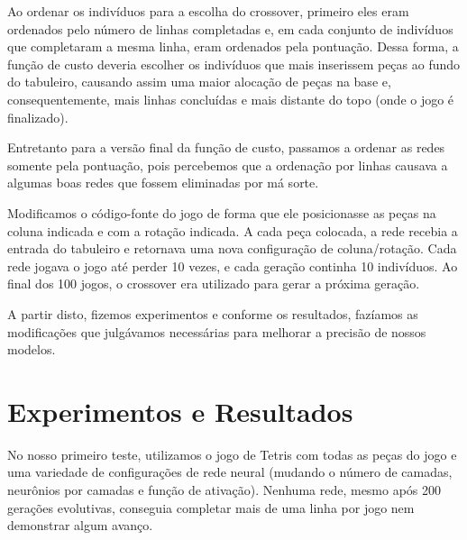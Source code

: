 \documentclass[conference]{IEEEtran}
\begin{document}
Ao ordenar os indivíduos para a escolha do crossover, primeiro eles eram ordenados pelo número de linhas completadas e, em cada conjunto de indivíduos que completaram a mesma linha, eram ordenados pela pontuação. Dessa forma, a função de custo deveria escolher os indivíduos que mais inserissem peças ao fundo do tabuleiro, causando assim uma maior alocação de peças na base e, consequentemente, mais linhas concluídas e mais distante do topo (onde o jogo é finalizado).

Entretanto para a versão final da função de custo, passamos a ordenar as redes somente pela pontuação, pois percebemos que a ordenação por linhas causava a algumas boas redes que fossem eliminadas por má sorte.

Modificamos o código-fonte do jogo de forma que ele posicionasse as peças na coluna indicada e com a rotação indicada. A cada peça colocada, a rede recebia a entrada do tabuleiro e retornava uma nova configuração de coluna/rotação. Cada rede jogava o jogo até perder 10 vezes, e cada geração continha 10 indivíduos. Ao final dos 100 jogos, o crossover era utilizado para gerar a próxima geração.

A partir disto, fizemos experimentos e conforme os resultados, fazíamos as modificações que julgávamos necessárias para melhorar a precisão de nossos modelos.

\section{Experimentos e Resultados}
No nosso primeiro teste, utilizamos o jogo de Tetris com todas as peças do jogo e uma variedade de configurações de rede neural (mudando o número de camadas, neurônios por camadas e função de ativação). Nenhuma rede, mesmo após 200 gerações evolutivas, conseguia completar mais de uma linha por jogo nem demonstrar algum avanço. 
\end{document}
